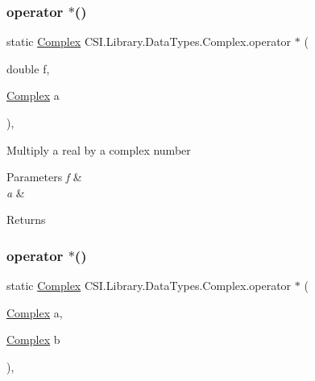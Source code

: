 \subsubsection{\texorpdfstring{operator $\ast$()}{operator *()}\hspace{0.1cm}{\footnotesize\ttfamily [2/3]}}
{\footnotesize\ttfamily static \mbox{\hyperlink{struct_c_s_i_1_1_library_1_1_data_types_1_1_complex}{Complex}} C\+S\+I.\+Library.\+Data\+Types.\+Complex.\+operator $\ast$ (\begin{DoxyParamCaption}\item[{double}]{f,  }\item[{\mbox{\hyperlink{struct_c_s_i_1_1_library_1_1_data_types_1_1_complex}{Complex}}}]{a }\end{DoxyParamCaption})\hspace{0.3cm}{\ttfamily [inline]}, {\ttfamily [static]}}



Multiply a real by a complex number 


\begin{DoxyParams}{Parameters}
{\em f} & \\
\hline
{\em a} & \\
\hline
\end{DoxyParams}
\begin{DoxyReturn}{Returns}

\end{DoxyReturn}
\mbox{\label{struct_c_s_i_1_1_library_1_1_data_types_1_1_complex_a29914d0aef04f55ee652187554e5d5d0}} 
\subsubsection{\texorpdfstring{operator $\ast$()}{operator *()}\hspace{0.1cm}{\footnotesize\ttfamily [3/3]}}
{\footnotesize\ttfamily static \mbox{\hyperlink{struct_c_s_i_1_1_library_1_1_data_types_1_1_complex}{Complex}} C\+S\+I.\+Library.\+Data\+Types.\+Complex.\+operator $\ast$ (\begin{DoxyParamCaption}\item[{\mbox{\hyperlink{struct_c_s_i_1_1_library_1_1_data_types_1_1_complex}{Complex}}}]{a,  }\item[{\mbox{\hyperlink{struct_c_s_i_1_1_library_1_1_data_types_1_1_complex}{Complex}}}]{b }\end{DoxyParamCaption})\hspace{0.3cm}{\ttfamily [inline]}, {\ttfamily [static]}}



